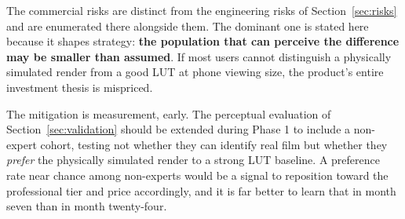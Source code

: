 The commercial risks are distinct from the engineering risks of
Section~\ref{sec:risks} and are enumerated there alongside them. The dominant
one is stated here because it shapes strategy: \textbf{the population that can
perceive the difference may be smaller than assumed}. If most users cannot
distinguish a physically simulated render from a good LUT at phone viewing size,
the product's entire investment thesis is mispriced.

The mitigation is measurement, early. The perceptual evaluation of
Section~\ref{sec:validation} should be extended during Phase 1 to include a
non-expert cohort, testing not whether they can identify real film but whether
they \emph{prefer} the physically simulated render to a strong LUT baseline. A
preference rate near chance among non-experts would be a signal to reposition
toward the professional tier and price accordingly, and it is far better to
learn that in month seven than in month twenty-four.
